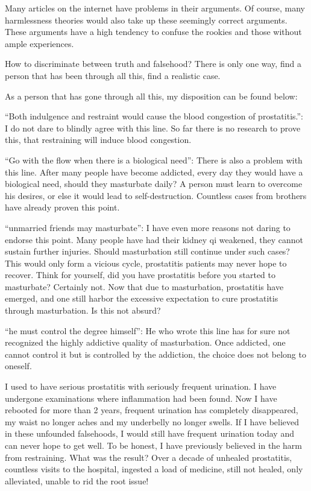 \documentclass[
]{book}
\begin{document}
Many articles on the internet have problems in their arguments. Of course, many harmlessness theories would also take up these seemingly correct arguments. These arguments have a high tendency to confuse the rookies and those without ample experiences.

How to discriminate between truth and falsehood? There is only one way, find a person that has been through all this, find a realistic case.

As a person that has gone through all this, my disposition can be found below:

``Both indulgence and restraint would cause the blood congestion of prostatitis.'': I do not dare to blindly agree with this line. So far there is no research to prove this, that restraining will induce blood congestion.

``Go with the flow when there is a biological need'': There is also a problem with this line. After many people have become addicted, every day they would have a biological need, should they masturbate daily? A person must learn to overcome his desires, or else it would lead to self-destruction. Countless cases from brothers have already proven this point.

``unmarried friends may masturbate'': I have even more reasons not daring to endorse this point. Many people have had their kidney qi weakened, they cannot sustain further injuries. Should masturbation still continue under such cases? This would only form a vicious cycle, prostatitis patients may never hope to recover. Think for yourself, did you have prostatitis before you started to masturbate? Certainly not. Now that due to masturbation, prostatitis have emerged, and one still harbor the excessive expectation to cure prostatitis through masturbation. Is this not absurd?

``he must control the degree himself'': He who wrote this line has for sure not recognized the highly addictive quality of masturbation. Once addicted, one cannot control it but is controlled by the addiction, the choice does not belong to oneself.

I used to have serious prostatitis with seriously frequent urination. I have undergone examinations where inflammation had been found. Now I have rebooted for more than 2 years, frequent urination has completely disappeared, my waist no longer aches and my underbelly no longer swells. If I have believed in these unfounded falsehoods, I would still have frequent urination today and can never hope to get well. To be honest, I have previously believed in the harm from restraining. What was the result? Over a decade of unhealed prostatitis, countless visits to the hospital, ingested a load of medicine, still not healed, only alleviated, unable to rid the root issue!
\end{document}
